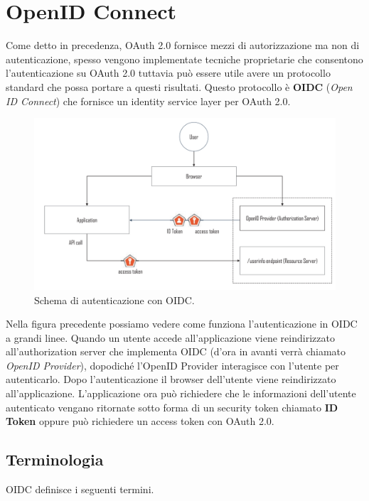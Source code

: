 \chapter{OpenID Connect}

Come detto in precedenza, OAuth 2.0 fornisce mezzi di autorizzazione ma non di
autenticazione, spesso vengono implementate tecniche proprietarie che consentono
l'autenticazione su OAuth 2.0 tuttavia può essere utile avere un protocollo standard
che possa portare a questi risultati.
Questo protocollo è \textbf{OIDC} (\textit{Open ID Connect}) che fornisce un identity service layer
per OAuth 2.0.

\begin{figure}[H]
      \centering
      \includegraphics[width=\textwidth, keepaspectratio]{capitoli/id_managing/imgs/oidc1.png}
      \caption{Schema di autenticazione con OIDC.}
\end{figure}

Nella figura precedente possiamo vedere come funziona l'autenticazione in OIDC a
grandi linee.
Quando un utente accede all'applicazione viene reindirizzato all'authorization server
che implementa OIDC (d'ora in avanti verrà chiamato \textit{OpenID Provider}),
dopodiché l'OpenID Provider interagisce con l'utente per autenticarlo.
Dopo l'autenticazione il browser dell'utente viene reindirizzato all'applicazione.
L'applicazione ora può richiedere che le informazioni dell'utente autenticato vengano
ritornate sotto forma di un security token chiamato \textbf{ID Token} oppure può
richiedere un access token con OAuth 2.0.

\section{Terminologia}

OIDC definisce i seguenti termini.

